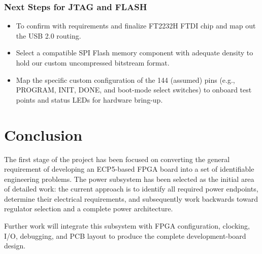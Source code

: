 \documentclass[12pt,a4paper]{article}
\begin{document}
\subsubsection{Next Steps for JTAG and FLASH}
\begin{itemize}[leftmargin=1cm]
    \item To confirm with requirements and finalize FT2232H FTDI chip and map out the USB 2.0 routing.
    \item Select a compatible SPI Flash memory component with adequate density to hold our custom uncompressed bitstream format.
    \item Map the specific custom configuration of the 144 (assumed) pins (e.g., PROGRAM, INIT, DONE, and boot-mode select switches) to onboard test points and status LEDs for hardware bring-up.
\end{itemize}


\section{Conclusion}

The first stage of the project has been focused on converting the general requirement of developing an ECP5-based FPGA board into a set of identifiable engineering problems. The power subsystem has been selected as the initial area of detailed work: the current approach is to identify all required power endpoints, determine their electrical requirements, and subsequently work backwards toward regulator selection and a complete power architecture.

Further work will integrate this subsystem with FPGA configuration, clocking, I/O, debugging, and PCB layout to produce the complete development-board design.
\end{document}
